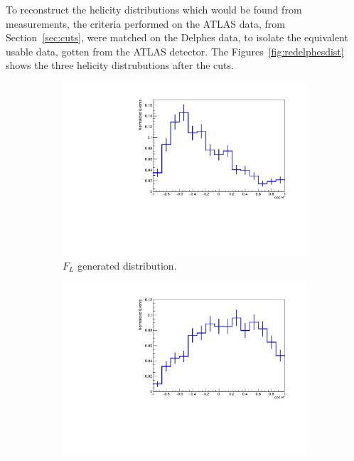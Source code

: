 \documentclass[12pt,a4paper]{article}
\numberwithin{equation}{section}
\begin{document}
To reconstruct the helicity distributions which would be found from
measurements, the criteria performed on the ATLAS data, from
Section~\ref{sec:cuts}, were matched on the Delphes data, to isolate the
equivalent usable data, gotten from the ATLAS detector. The
Figures~\ref{fig:redelphesdist} shows the three helicity distrubutions after the
cuts.
\begin{figure}[t!]
  \centering
  \begin{subfigure}[t]{0.5\textwidth}
    \centering
    \includegraphics[width=1.0\textwidth]{figures/delphes_ctstarL}
    \caption{$F_L$ generated distribution.}
  \end{subfigure}%
  \begin{subfigure}[t]{0.5\textwidth}
    \centering
    \includegraphics[width=1.0\textwidth]{figures/delphes_ctstarR}

\end{subfigure}
\end{figure}
\end{document}
